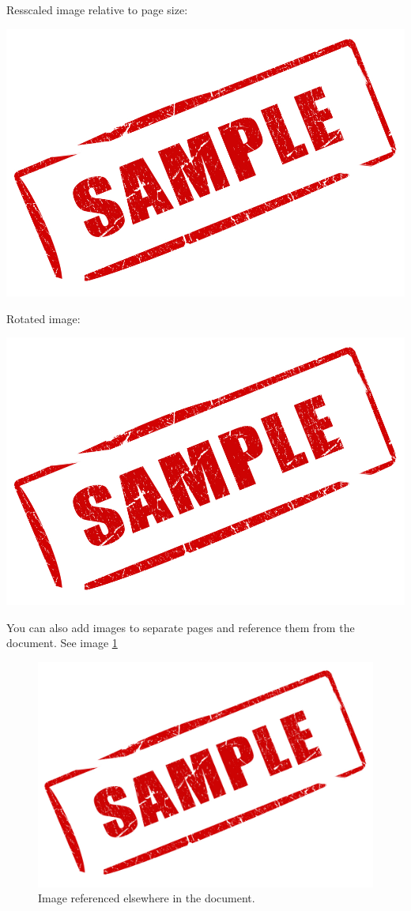\documentclass[12pt, letterpaper]{article}
\begin{document}
Resscaled image relative to page size:
\begin{center}
\includegraphics[width=\textwidth]{sampleLarge}
\end{center}

\newpage
Rotated image:
\begin{center}
\includegraphics[angle=45, scale=0.5]{sampleLarge}
\end{center}

You can also add images to separate pages and reference them from the document. See image \ref{figure:1}
\begin{figure}[p!]
\centering
\includegraphics[scale=0.5]{sampleLarge}
\caption{Image referenced elsewhere in the document.}
\label{figure:1}
\end{figure}
\end{document}
